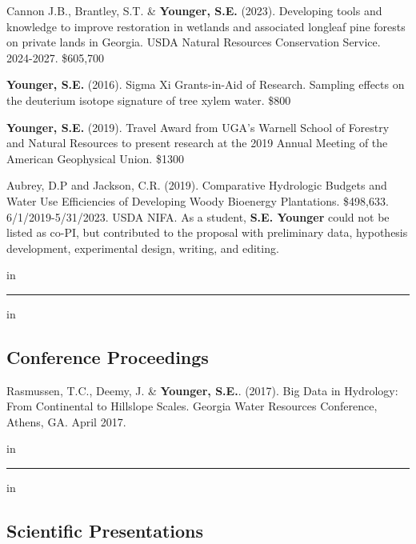 \documentclass[10pt,letterpaper]{article}
\begin{document}
	\begin{hangparas}{.25in}{1}
		
		Cannon J.B., Brantley, S.T. \& \textbf{Younger, S.E.} (2023). Developing tools and knowledge to improve restoration in wetlands and associated longleaf pine forests on private lands in Georgia. USDA Natural Resources Conservation Service. 2024-2027. \$605,700
		
		\textbf{Younger, S.E.} (2016). Sigma Xi Grants-in-Aid of Research. Sampling effects on the deuterium isotope signature of tree xylem water. \$800
		
		\textbf{Younger, S.E.} (2019). Travel Award from UGA's Warnell School of Forestry and Natural Resources to present research at the 2019 Annual Meeting of the American Geophysical Union. \$1300
		
		Aubrey, D.P and Jackson, C.R. (2019). Comparative Hydrologic Budgets and Water Use Efficiencies of Developing Woody Bioenergy Plantations. \$498,633. 6/1/2019-5/31/2023. USDA NIFA. As a student, \textbf{S.E. Younger} could not be listed as co-PI, but contributed to the proposal with preliminary data, hypothesis development, experimental design, writing, and editing.
		
		\vspace{-0.4em}
		 in
		
	\end{hangparas}
	
	\hrule
	\vspace{-0.4em}
	 in
	\subsection*{Conference Proceedings}
	
	\begin{hangparas}{.25in}{1}
		
		Rasmussen, T.C., Deemy, J. \& \textbf{Younger, S.E.}. (2017). Big Data in Hydrology: From Continental to Hillslope Scales. Georgia Water Resources Conference, Athens, GA. April 2017.
		
	\end{hangparas}
	
	 in
	
	
	\hrule
	\vspace{-0.4em}
	 in
	
	\subsection*{Scientific Presentations}
	
\end{document}
